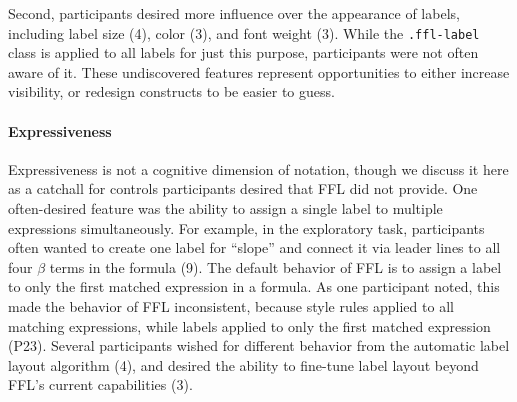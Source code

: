 Second, participants desired more influence over the appearance of labels, including label size (4), color (3), and font weight (3). While the \texttt{.ffl-label} class is applied to all labels for just this purpose, participants were not often aware of it. These undiscovered features represent opportunities to either increase visibility, or redesign constructs to be easier to guess.

\paragraph{Expressiveness}
Expressiveness is not a cognitive dimension of notation, though we discuss it here as a catchall for controls participants desired that FFL did not provide. One often-desired feature was the ability to assign a single label to multiple expressions simultaneously. For example, in the exploratory task, participants often wanted to create one label for ``slope'' and connect it via leader lines to all four $\beta$ terms in the formula (9). The default behavior of FFL is to assign a label to only the first matched expression in a formula. As one participant noted, this made the behavior of FFL inconsistent, because style rules applied to all matching expressions, while labels applied to only the first matched expression (P23). Several participants wished for different behavior from the automatic label layout algorithm (4), and desired the ability to fine-tune label layout beyond FFL's current capabilities (3).



